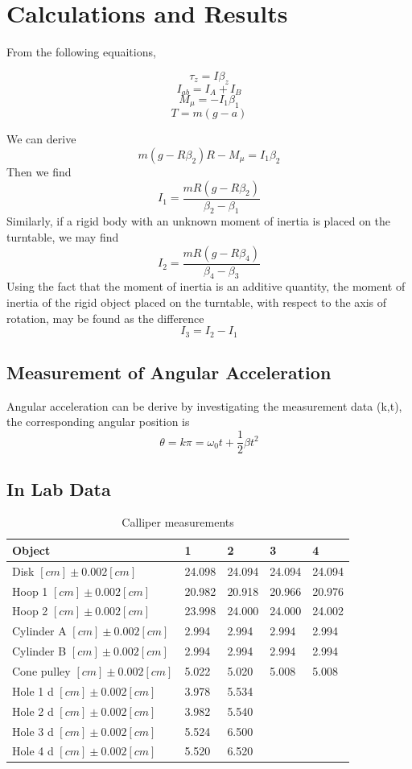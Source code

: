 \section{Calculations and Results}
From the following equaitions,

$$ \tau_z = I\beta_z $$
$$ I_{ab} = I_A + I_B $$
$$ M_\mu = -I_1\beta_1 $$
$$ T = m(g-a)$$

We can derive
$$ m(g-R\beta_2)R-M_\mu=I_1\beta_2 $$
Then we find
$$ I_1=\frac{mR(g-R\beta_2)}{\beta_2-\beta_1} $$
Similarly, if a rigid body with an unknown moment of inertia is placed on the
turntable, we may find 
$$ I_2=\frac{mR(g-R\beta_4)}{\beta_4-\beta_3} $$
Using the fact that the moment of inertia is an additive quantity, the moment of
inertia of the rigid object placed on the turntable, with respect to the axis of
rotation, may be found as the difference 
$$ I_3 = I_2 - I_1 $$

\subsection{Measurement of Angular Acceleration}
Angular acceleration can be derive by investigating the measurement data (k,t),
the corresponding angular position is
$$ \theta = k\pi = \omega_0 t + \frac{1}{2}\beta t^2 $$


\subsection{In Lab Data}

\begin{table}[H]
  \centering
  \begin{tabularx}{\textwidth}{|p{6cm}|X|X|X|X|}
    \hline
    Object & 1 & 2 & 3 & 4 \\
    \hline
    Disk $[cm] \pm 0.002[cm]$& 24.098 & 24.094 & 24.094 & 24.094 \\
    Hoop 1 $[cm] \pm 0.002[cm]$& 20.982 & 20.918 & 20.966 & 20.976 \\
    Hoop 2 $[cm] \pm 0.002[cm]$& 23.998 & 24.000 & 24.000 & 24.002 \\
    Cylinder A $[cm] \pm 0.002[cm]$& 2.994 & 2.994 & 2.994 & 2.994 \\
    Cylinder B $[cm] \pm 0.002[cm]$& 2.994 & 2.994 & 2.994 & 2.994 \\
    Cone pulley $[cm] \pm 0.002[cm]$& 5.022 & 5.020 & 5.008 & 5.008 \\
    Hole 1 d $[cm] \pm 0.002[cm]$& 3.978 & 5.534 & & \\
    Hole 2 d $[cm] \pm 0.002[cm]$& 3.982 & 5.540 & & \\
    Hole 3 d $[cm] \pm 0.002[cm]$& 5.524 & 6.500 & & \\
    Hole 4 d $[cm] \pm 0.002[cm]$& 5.520 & 6.520 & & \\
    \hline
  \end{tabularx}
  \caption{Calliper measurements}
  \end{table}


